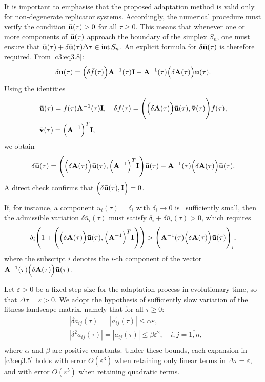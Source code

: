 \documentclass[12pt]{report}
\newcommand{\inside}{\mathrm{int}\,}
\theoremstyle{definition}
\theoremstyle{remark}
\begin{document}
It is important to emphasise that the proposed adaptation method is valid only for non-degenerate replicator systems. Accordingly, the numerical procedure must verify the condition ${\bf \bar{u}}(\tau) > 0$ for all $\tau \geqslant 0$. This means that whenever one or more components of ${\bf \bar{u}}(\tau)$ approach the boundary of the simplex $S_{n}$, one must ensure that ${\bf \bar{u}}(\tau) + \delta{\bf \bar{u}}(\tau)\Delta\tau \in \inside S_{n}$. An explicit formula for $\delta{\bf \bar{u}}(\tau)$ is therefore required. From \eqref{c3:eq3.8}:
$$
	\delta{\bf \bar{u}}(\tau) = \Big(\delta\bar{f}(\tau)\Big){\bf A}^{-1}(\tau){\bf I} - {\bf A}^{-1}(\tau)\Big(\delta{\bf A}(\tau)\Big){\bf \bar{u}}(\tau).
$$ 
Using the identities
\begin{equation*}
	\begin{aligned}
		&{\bf \bar{u}}(\tau) = \bar{f}(\tau){\bf A}^{-1}(\tau){\bf I}, \quad \delta\bar{f}(\tau) = \Bigg(\Big(\delta{\bf A}(\tau)\Big){\bf \bar{u}}(\tau), {\bf \bar{v}}(\tau)\Bigg)\bar{f}(\tau), \\
		&{\bf \bar{v}}(\tau) = \Big({\bf A}^{-1}\Big)^{T}{\bf I},
	\end{aligned}
\end{equation*}
we obtain
\begin{equation}
	\delta{\bf \bar{u}}(\tau) = \Bigg(\Big(\delta{\bf A}(\tau)\Big){\bf \bar{u}}(\tau), \Big({\bf A}^{-1}\Big)^{T}{\bf I}\Bigg){\bf \bar{u}}(\tau) - {\bf A}^{-1}(\tau)\Big(\delta{\bf A}(\tau)\Big){\bf \bar{u}}(\tau).
	\label{c3:eq3.13}
\end{equation}
A direct check confirms that $\Big(\delta{\bf \bar{u}}(\tau), {\bf I}\Big) = 0$.

If, for instance, a component $\bar{u}_{i}(\tau) = \delta_{i}$ with $\delta_{i} \to 0$ is  sufficiently small, then the admissible variation $\delta\bar{u}_{i}(\tau)$ must satisfy $\delta_{i} + \delta\bar{u}_{i}(\tau) > 0$, which requires
$$
	\delta_{i}\Bigg(1 + \Bigg(\Big(\delta{\bf A}(\tau)\Big){\bf \bar{u}}(\tau), \Big({\bf A}^{-1}\Big)^{T}{\bf I}\Bigg)\Bigg) > \Bigg({\bf A}^{-1}(\tau)\Big(\delta{\bf A}(\tau)\Big){\bf \bar{u}}(\tau)\Bigg)_{i},
$$
where the subscript $i$ denotes the $i$-th component of the vector ${\bf A}^{-1}(\tau)\Big(\delta{\bf A}(\tau)\Big){\bf \bar{u}}(\tau)$.

Let $\varepsilon > 0$ be a fixed step size for the adaptation process in evolutionary time, so that $\Delta\tau = \varepsilon > 0$. We adopt the hypothesis of sufficiently slow variation of the fitness landscape matrix, namely that for all $\tau \geqslant 0$:
$$
	\begin{aligned}
		&\displaystyle|\delta a_{ij}(\tau)| = |a_{ij}^{'}(\tau)| \leqslant \alpha\varepsilon, \\
		&\displaystyle|\delta^{2} a_{ij}(\tau)| = |a_{ij}^{''}(\tau)| \leqslant \beta\varepsilon^{2}, \quad i, j = \overline{1, n},\\
	\end{aligned}
$$
where $\alpha$ and $\beta$ are positive constants. Under these bounds, each expansion in \eqref{c3:eq3.5} holds with error $O(\varepsilon^{3})$ when retaining only linear terms in $\Delta\tau = \varepsilon$, and with error $O(\varepsilon^{5})$ when retaining quadratic terms.
\end{document}
